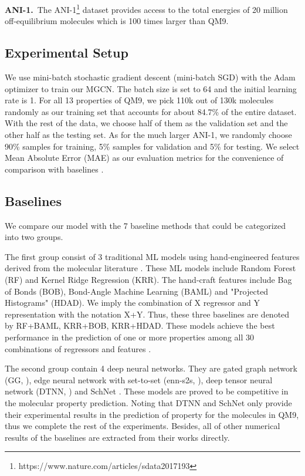 \documentclass[letterpaper]{article} \usepackage{bm}
\begin{document}
\noindent \textbf{ANI-1.}\ The ANI-1\footnote{https://www.nature.com/articles/sdata2017193} dataset provides access to the total energies of 20 million off-equilibrium molecules which is 100 times larger than QM9.


\subsection{Experimental Setup}  
 
We use mini-batch stochastic gradient descent (mini-batch SGD) with the Adam optimizer \cite{Kingma2014Adam} to train our MGCN. The batch size is set to 64 and the initial learning rate is 1. For all 13 properties of QM9, we pick 110k out of 130k molecules randomly as our training set that accounts for about 84.7\% of the entire dataset. With the rest of the data, we choose half of them as the validation set and the other half as the testing set. As for the much larger ANI-1, we randomly choose 90\% samples for training, 5\% samples for validation and 5\% for testing. We select Mean Absolute Error (MAE) as our evaluation metrics for the convenience of comparison with baselines \cite{faber2017prediction}.

\subsection{Baselines}  

We compare our model with the 7 baseline methods that could be categorized into two groups.   

The first group consist of 3 traditional ML models using hand-engineered features derived from the molecular literature \cite{faber2017prediction,huang2016communication,hansen2015machine}. These ML models include Random Forest (RF) and Kernel Ridge Regression (KRR). The hand-craft features include Bag of Bonds (BOB), Bond-Angle Machine Learning (BAML) and "Projected Histograms" (HDAD). We imply the combination of X regressor and Y representation with the notation X+Y. Thus, these three baselines are denoted by RF+BAML, KRR+BOB, KRR+HDAD. These models achieve the best performance in the prediction of one or more properties among all 30 combinations of regressors and features \cite{faber2017prediction}. 
 
The second group contain 4 deep neural networks. They are gated graph network (GG, \citeauthor{kearnes2016molecular} \citeyear{kearnes2016molecular}), edge neural network with set-to-set (enn-s2s, \citeauthor{Gilmer2017NeuralMP} \citeyear{Gilmer2017NeuralMP}), deep tensor neural network (DTNN, \citeauthor{schutt2017schnet} \citeyear{schutt2017quantum}) and SchNet \cite{schutt2017schnet}. These models are proved to be competitive in the molecular property prediction. Noting that DTNN and SchNet only provide their experimental results in the prediction of property  for the molecules in QM9, thus we complete the rest of the experiments. Besides, all of other numerical results of the baselines are extracted from their works directly.
\end{document}

